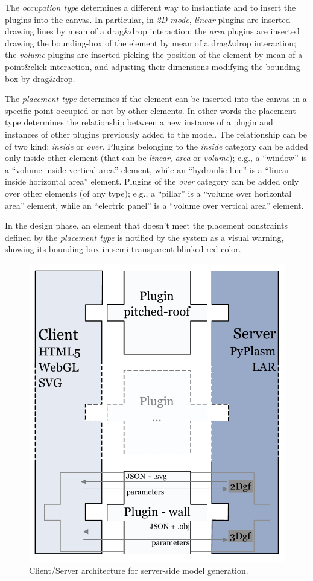 The \emph{occupation type} determines a different way to instantiate and to insert the plugins into the canvas.
In particular, in \emph{2D-mode}, \emph{linear} plugins are inserted drawing lines by mean of a drag\&drop interaction;
the \emph{area} plugins are inserted drawing the bounding-box of the element by mean of a drag\&drop interaction;
the \emph{volume} plugins are inserted picking the position of the element by mean of a point\&click interaction,
and adjusting their dimensions modifying the bounding-box by drag\&drop.

The \emph{placement type} determines if the element can be inserted into the canvas in a specific point occupied or not by other elements. In other words 
the {placement type} determines the relationship between a new instance of a plugin and instances of other plugins previously added to the model. The relationship can be of two kind: \emph{inside} or \emph{over}.
Plugins belonging to the \emph{inside} category can be added only inside other element (that can be \emph{linear}, \emph{area} or \emph{volume}); e.g., a ``window'' is a ``volume inside vertical area'' element,
while an ``hydraulic line'' is a ``linear inside horizontal area'' element.
Plugins of the \emph{over} category can be added only over other elements (of any type);
e.g., a ``pillar'' is a ``volume over horizontal area'' element,
while an ``electric panel'' is a ``volume over vertical area'' element.

In the design phase, an element that doesn't meet the placement constraints defined by the \emph{placement type} is notified by the system as a visual warning, showing its bounding-box in semi-transparent blinked red color.

\begin{figure}[htbp] %
   \centering

   \includegraphics[width=0.6\linewidth]{images/architecture-h}

   \caption{Client/Server architecture for server-side model generation.}
   \label{fig:c-s-arch}
\end{figure}

